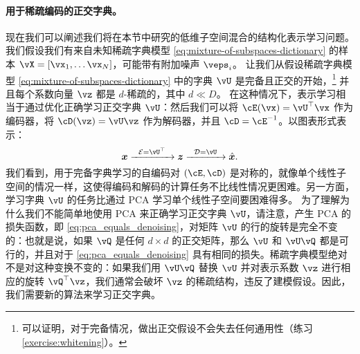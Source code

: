 \documentclass[../../book-main_zh.tex]{subfiles}
\begin{document}

\paragraph{用于稀疏编码的正交字典。}
现在我们可以阐述我们将在本节中研究的低维子空间混合的结构化表示学习问题。
我们假设我们有来自未知稀疏字典模型 \eqref{eq:mixture-of-subspaces-dictionary} 的样本 $\vX = [\vx_1, \dots \vx_N]$，可能带有附加噪声 $\veps_i$。
让我们从假设稀疏字典模型 \eqref{eq:mixture-of-subspaces-dictionary} 中的字典 $\vU$ 是完备且正交的开始，\footnote{可以证明，对于完备情况，做出正交假设不会失去任何通用性（练习 \ref{exercise:whitening}）。} 并且每个系数向量 $\vz$ 都是 $d$-稀疏的，其中 $d \ll D$。
在这种情况下，表示学习相当于{通过优化正确学习正交字典 $\vU$}：然后我们可以将 $\cE(\vx) = \vU^\top \vx$ 作为编码器，将 $\cD(\vz) = \vU \vz$ 作为解码器，并且 $\cD = \cE^{-1}$。以图表形式表示：
\begin{equation}
\x \xrightarrow{\hspace{2mm} \mathcal{E} = \vU^\top \hspace{2mm}}  \z \xrightarrow{\hspace{2mm} \mathcal{D} = \vU \hspace{2mm}}   \hat{\x}.  
\label{eqn:autoencoding-DL}
\end{equation}    
我们看到，用于完备字典学习的自编码对 $(\cE, \cD)$ 是对称的，就像单个线性子空间的情况一样，这使得编码和解码的计算任务不比线性情况更困难。另一方面，学习字典 $\vU$ 的任务比通过 PCA 学习单个线性子空间要困难得多。
为了理解为什么我们不能简单地使用 PCA 来正确学习正交字典 $\vU$，请注意，产生 PCA 的损失函数，即 \eqref{eq:pca_equals_denoising}，对矩阵 $\vU$ 的行的旋转是完全不变的：也就是说，如果 $\vQ$ 是任何 $d \times d$ 的正交矩阵，那么 $\vU$ 和 $\vU \vQ$ 都是可行的，并且对于 \eqref{eq:pca_equals_denoising} 具有相同的损失。稀疏字典模型绝对不是对这种变换不变的：如果我们用 $\vU \vQ$ 替换 $\vU$ 并对表示系数 $\vz$ 进行相应的旋转 $\vQ^\top \vz$，我们通常会破坏 $\vz$ 的稀疏结构，违反了建模假设。因此，我们需要新的算法来学习正交字典。
\end{document}

